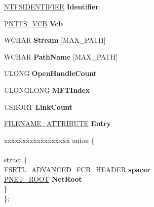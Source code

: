 \begin{DoxyCompactItemize}
\begin{tabbing}
\end{tabbing}\item 
\mbox{\label{struct___f_c_b_a697052f5d2aa015954f538e0a5cfc627}} 
\hyperlink{struct_n_t_f_s_i_d_e_n_t_i_f_i_e_r}{N\+T\+F\+S\+I\+D\+E\+N\+T\+I\+F\+I\+ER} {\bfseries Identifier}
\item 
\mbox{\label{struct___f_c_b_a3b8674672adafaf82b679251b53c14e2}} 
\hyperlink{struct_d_e_v_i_c_e___e_x_t_e_n_s_i_o_n}{P\+N\+T\+F\+S\+\_\+\+V\+CB} {\bfseries Vcb}
\item 
\mbox{\label{struct___f_c_b_a55c99948f09843c16e51381a43ef8164}} 
W\+C\+H\+AR {\bfseries Stream} \mbox{[}M\+A\+X\+\_\+\+P\+A\+TH\mbox{]}
\item 
\mbox{\label{struct___f_c_b_abf69b2dfc966ac4667ca2e65d8e010f0}} 
W\+C\+H\+AR {\bfseries Path\+Name} \mbox{[}M\+A\+X\+\_\+\+P\+A\+TH\mbox{]}
\item 
\mbox{\label{struct___f_c_b_add13e79cd9fd2b484e76a334bda3f75b}} 
U\+L\+O\+NG {\bfseries Open\+Handle\+Count}
\item 
\mbox{\label{struct___f_c_b_a52eeb77afe7a03f1dfd1e0c2055231cc}} 
U\+L\+O\+N\+G\+L\+O\+NG {\bfseries M\+F\+T\+Index}
\item 
\mbox{\label{struct___f_c_b_ad23b8b3746a5e4a280b7d8967773e15e}} 
U\+S\+H\+O\+RT {\bfseries Link\+Count}
\item 
\mbox{\label{struct___f_c_b_ae94c2441821a048c93eed0eeec447322}} 
\hyperlink{struct_f_i_l_e_n_a_m_e___a_t_t_r_i_b_u_t_e}{F\+I\+L\+E\+N\+A\+M\+E\+\_\+\+A\+T\+T\+R\+I\+B\+U\+TE} {\bfseries Entry}
\item 
\mbox{\label{struct___f_c_b_a5458e1598fd2f0dd0be7355232f13bd3}} 
\begin{tabbing}
xx\=xx\=xx\=xx\=xx\=xx\=xx\=xx\=xx\=\kill
union \{\\
\\
\mbox{\label{union___f_c_b_1_1_0D1580_a492b04eb0367aa895aae0b2caab250b8}} 
\>struct \{\\
\>\>\hyperlink{struct___f_s_r_t_l___a_d_v_a_n_c_e_d___f_c_b___h_e_a_d_e_r}{FSRTL\_ADVANCED\_FCB\_HEADER} {\bfseries spacer}\\
\>\>\hyperlink{struct___n_e_t___r_o_o_t}{PNET\_ROOT} {\bfseries NetRoot}\\
\>\} \\
\}; \\


\end{tabbing}
\end{DoxyCompactItemize}
